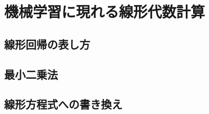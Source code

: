 \section{機械学習に現れる線形代数計算}
\label{sec:linear-regression-normal-equation}

\subsection{線形回帰の表し方}
\label{subsec:linear-regression-formulation}

\subsection{最小二乗法}
\label{subsec:least-squares-method}

\subsection{線形方程式への書き換え}
\label{subsec:reduction-to-linear-system}

